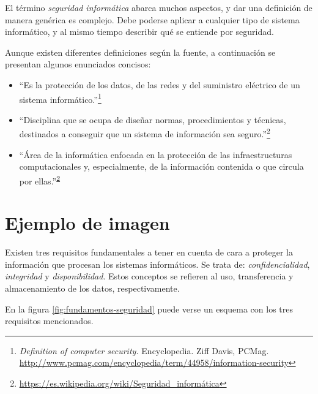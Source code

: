 \documentclass[12pt,a4paper,onecolumn,oneside]{report}
\begin{document}
El término \emph{seguridad informática} abarca muchos aspectos, y dar una definición de manera genérica es complejo. Debe poderse aplicar a cualquier tipo de sistema informático, y al mismo tiempo describir qué se entiende por seguridad.

Aunque existen diferentes definiciones según la fuente, a continuación se presentan algunos enunciados concisos:

\begin{itemize}

\item ``Es la protección de los datos, de las redes y del suministro eléctrico de un sistema informático.''\footnote{\textit{Definition of computer security.} Encyclopedia. Ziff Davis, PCMag. \url{http://www.pcmag.com/encyclopedia/term/44958/information-security}}

\item ``Disciplina que se ocupa de diseñar normas, procedimientos y técnicas, destinados a conseguir que un sistema de información sea seguro.''\footnote{\url{https://es.wikipedia.org/wiki/Seguridad_informática}\label{segWiki}}

\item ``Área de la informática enfocada en la protección de las infraestructuras computacionales y, especialmente, de la información contenida o que circula por ellas.''\textsuperscript{\ref{segWiki}}

\end{itemize}
 

\section*{Ejemplo de imagen}

Existen tres requisitos fundamentales a tener en cuenta de cara a proteger la información que procesan los sistemas informáticos.
Se trata de: \textit{confidencialidad}, \textit{integridad} y \textit{disponibilidad}. Estos conceptos se refieren al uso, transferencia y almacenamiento de los datos, respectivamente.

En la figura \ref{fig:fundamentos-seguridad} puede verse un esquema con los tres requisitos mencionados.
\end{document}
